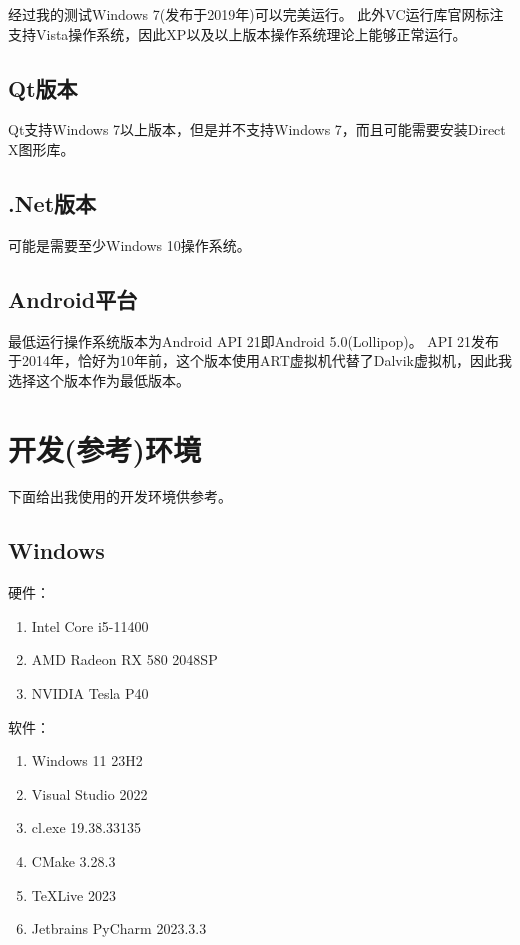 经过我的测试Windows 7(发布于2019年)可以完美运行。
此外VC运行库官网标注支持Vista操作系统，因此XP以及以上版本操作系统理论上能够正常运行。

\subsection{Qt版本}

Qt支持Windows 7以上版本，但是并不支持Windows 7，而且可能需要安装Direct X图形库。

\subsection{.Net版本}

可能是需要至少Windows 10操作系统。

\subsection{Android平台}

最低运行操作系统版本为Android API 21即Android 5.0(Lollipop)。
API 21发布于2014年，恰好为10年前，这个版本使用ART虚拟机代替了Dalvik虚拟机，因此我选择这个版本作为最低版本。

\section{开发(参考)环境}

下面给出我使用的开发环境供参考。

\subsection{Windows}

硬件：
\begin{enumerate}
	\item Intel Core i5-11400
	\item AMD Radeon RX 580 2048SP
	\item NVIDIA Tesla P40
\end{enumerate}

软件：
\begin{enumerate}
	\item Windows 11 23H2
	\item Visual Studio 2022
	\item cl.exe 19.38.33135
	\item CMake 3.28.3
	\item TeXLive 2023
	\item Jetbrains PyCharm 2023.3.3
\end{enumerate}

